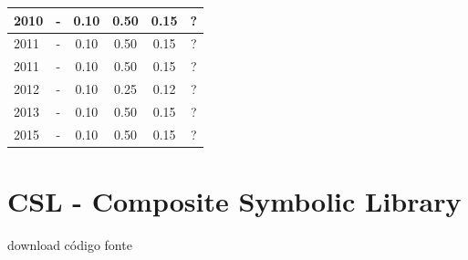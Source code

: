 \begin{table}[H]
\begin{tabular}{| l | c | c | c | c | c |}
          \\
\hline
            2010
          &
          -
          &
          0.10
          &
          0.50
          &
            {\color{red} 0.15}
          &
          ?
          \\
\hline
            2011
          &
          -
          &
          0.10
          &
          0.50
          &
            {\color{red} 0.15}
          &
          ?
          \\
            2011
          &
          -
          &
          0.10
          &
          0.50
          &
            {\color{red} 0.15}
          &
          ?
          \\
\hline
            2012
          &
          -
          &
          0.10
          &
          0.25
          &
            {\color{red} 0.12}
          &
          ?
          \\
\hline
            2013
          &
          -
          &
          0.10
          &
          0.50
          &
            {\color{red} 0.15}
          &
          ?
          \\
\hline
            2015
          &
          -
          &
          0.10
          &
          0.50
          &
            {\color{red} 0.15}
          &
          ?
          \\
\hline
\end{tabular}
\end{table}



\section{CSL - Composite Symbolic Library}
\checkmark download
\checkmark código fonte



